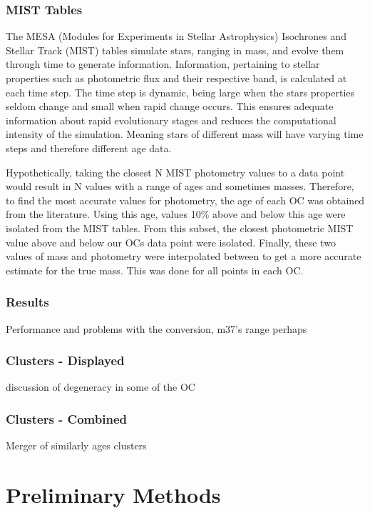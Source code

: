 \documentclass[fleqn,usenatbib]{mnras}
\begin{document}
\subsubsection{MIST Tables}
The MESA (Modules for Experiments in Stellar Astrophysics) Isochrones and Stellar Track (MIST) tables simulate stars, ranging in mass, and evolve them through time to generate information.
Information, pertaining to stellar properties such as photometric flux and their respective band, is calculated at each time step.
The time step is dynamic, being large when the stars properties seldom change and small when rapid change occurs.
This ensures adequate information about rapid evolutionary stages and reduces the computational intensity of the simulation.
Meaning stars of different mass will have varying time steps and therefore different age data.

Hypothetically, taking the closest N MIST photometry values to a data point would result in N values with a range of ages and sometimes masses.
Therefore, to find the most accurate values for photometry, the age of each OC was obtained from the literature.
Using this age, values 10\% above and below this age were isolated from the MIST tables.
From this subset, the closest photometric MIST value above and below our OCs data point were isolated.
Finally, these two values of mass and photometry were interpolated between to get a more accurate estimate for the true mass.
This was done for all points in each OC.

\subsubsection{Results}
Performance and problems with the conversion, m37's range perhaps

\subsubsection{Clusters - Displayed}
discussion of degeneracy in some of the OC

\subsubsection{Clusters - Combined}
Merger of similarly ages clusters





\section{Preliminary Methods}
\end{document}

